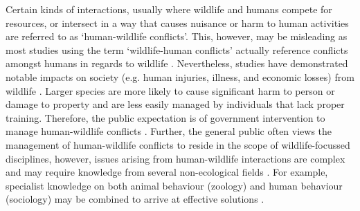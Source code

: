 Certain kinds of interactions, usually where wildlife and humans compete for resources, or intersect in a way that causes nuisance or harm to human activities are referred to as `human-wildlife conflicts'. This, however, may be misleading as most studies using the term `wildlife-human conflicts' actually reference conflicts amongst humans in regards to wildlife \citep{pete10}. Nevertheless, studies have demonstrated notable impacts on society (e.g. human injuries, illness, and economic losses) from wildlife \citep{cono95}. Larger species are more likely to cause significant harm to person or damage to property \citep{cono01} and are less easily managed by individuals that lack proper training. Therefore, the public expectation is of government intervention to manage human-wildlife conflicts \citep{reit99}. Further, the general public often views the management of human-wildlife conflicts to reside in the scope of wildlife-focussed disciplines, however, issues arising from human-wildlife interactions are complex and may require knowledge from several non-ecological fields \citep{deck97,madd04}. For example, specialist knowledge on both animal behaviour (zoology) and human behaviour (sociology) may be combined to arrive at effective solutions \citep{dicka10}.


%
%

